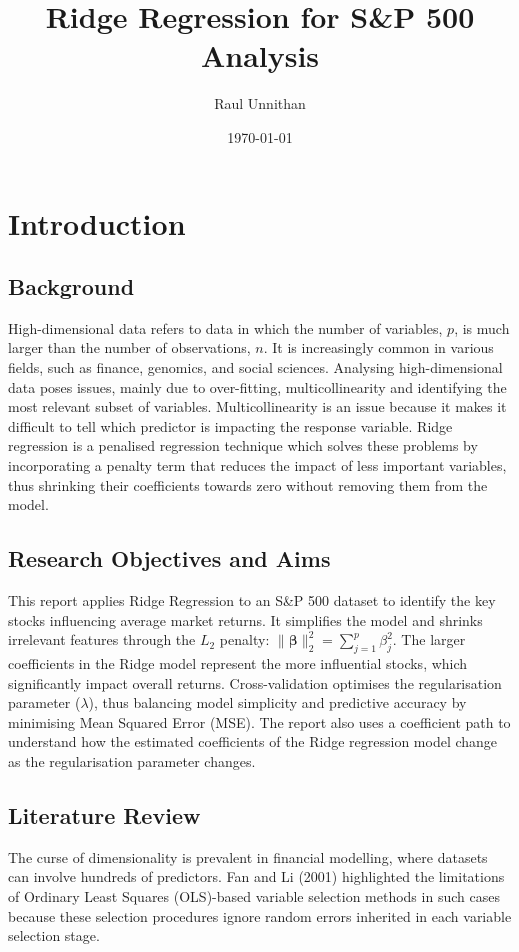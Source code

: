\documentclass[12pt]{report} %
\title{Ridge Regression for S\&P 500 Analysis}
\author{Raul Unnithan}
\date{\today}
\begin{document}
\maketitle

\tableofcontents

\chapter{Introduction}
\section{Background}
High-dimensional data refers to data in which the number of variables, $p$, is much larger than the number of observations, $n$.\cite{reza2024} It is increasingly common in various fields, such as finance, genomics, and social sciences. Analysing high-dimensional data poses issues, mainly due to over-fitting, multicollinearity and identifying the most relevant subset of variables.\cite{reza2024} Multicollinearity is an issue because it makes it difficult to tell which predictor is impacting the response variable. Ridge regression is a penalised regression technique which solves these problems by incorporating a penalty term that reduces the impact of less important variables, thus shrinking their coefficients towards zero without removing them from the model.\cite{hailiang2023}

\section{Research Objectives and Aims}
This report applies Ridge Regression to an S\&P 500 dataset to identify the key stocks influencing average market returns. It simplifies the model and shrinks irrelevant features through the $L_2$ penalty: \(\|\boldsymbol{\beta}\|_2^2 = \sum_{j=1}^{p} \beta_j^2\). The larger coefficients in the Ridge model represent the more influential stocks, which significantly impact overall returns. Cross-validation optimises the regularisation parameter ($\lambda$), thus balancing model simplicity and predictive accuracy by minimising Mean Squared Error (MSE). The report also uses a coefficient path to understand how the estimated coefficients of the Ridge regression model change as the regularisation parameter changes.

\section{Literature Review}
The curse of dimensionality is prevalent in financial modelling, where datasets can involve hundreds of predictors. Fan and Li (2001) highlighted the limitations of Ordinary Least Squares (OLS)-based variable selection methods in such cases because these selection procedures ignore random errors inherited in each variable selection stage. \cite{fanli2001} 
\end{document}
